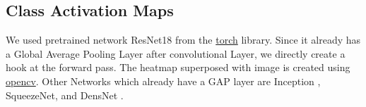 \subsection{Class Activation Maps}
We used pretrained network ResNet18 \cite{ResNet} from the \href{https://pytorch.org/}{torch} library. 
Since it already has a Global Average Pooling Layer after convolutional Layer, we directly create a hook at the forward pass. The heatmap superposed with image is created using \href{https://opencv.org/}{opencv}.
Other Networks which already have a GAP layer are Inception \cite{Inception}, SqueezeNet\cite{SqueezeNet}, and DensNet \cite{DensNet}.